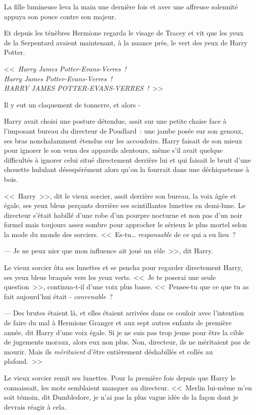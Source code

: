 La fille lumineuse leva la main une dernière fois et avec une affreuse solennité appuya son pouce contre son majeur.

Et depuis les ténèbres Hermione regarda le visage de Tracey et vit que les yeux de la Serpentard avaient maintenant, à la nuance près, le vert des yeux de Harry Potter.

<<~\emph{Harry James Potter-Evans-Verres~!\\
Harry James Potter-Evans-Verres~!\\
HARRY JAMES POTTER-EVANS-VERRES~!}~>>

Il y eut un claquement de tonnerre, et alors -

\later

Harry avait choisi une posture détendue, assit sur une petite chaise face à l'imposant bureau du directeur de Poudlard~: une jambe posée sur son genoux, ses bras nonchalamment étendus sur les accoudoirs. Harry faisait de son mieux pour ignorer le son venu des appareils alentours, même s'il avait quelque difficultés à ignorer celui situé directement derrière lui et qui faisait le bruit d'une chouette hululant désespérément alors qu'on la fourrait dans une déchiqueteuse à bois.

<<~Harry~>>, dit le vieux sorcier, assit derrière son bureau, la voix âgée et égale, ses yeux bleus perçants derrière ses scintillantes lunettes en demi-lune. Le directeur s'était habillé d'une robe d'un pourpre nocturne et non pas d'un noir formel mais toujours assez sombre pour approcher le sérieux le plus mortel selon la mode du monde des sorciers. <<~Es-tu… \emph{responsable} de ce qui a eu lieu~?

--- Je ne peux nier que mon influence ait joué un rôle~>>, dit Harry.

Le vieux sorcier ôta ses lunettes et se pencha pour regarder directement Harry, ses yeux bleus braqués vers les yeux verts. <<~Je te poserai une seule question~>>, continua-t-il d'une voix plus basse. <<~Penses-tu que ce que tu as fait aujourd'hui était - \emph{convenable}~?

--- Des brutes étaient là, et elles étaient arrivées dans ce couloir avec l'intention de faire du mal à Hermione Granger et aux sept autres enfants de première année, dit Harry d'une voix égale. Si je ne suis pas trop jeune pour être la cible de jugements moraux, alors eux non plus. Non, directeur, ils ne méritaient pas de mourir. Mais ils \emph{méritaient} d'être entièrement déshabillés et collés au plafond.~>>

Le vieux sorcier remit ses lunettes. Pour la première fois depuis que Harry le connaissait, les mots semblaient manquer au directeur. <<~Merlin lui-même m'en soit témoin, dit Dumbledore, je n'ai pas la plus vague idée de la façon dont je devrais réagir à cela.


